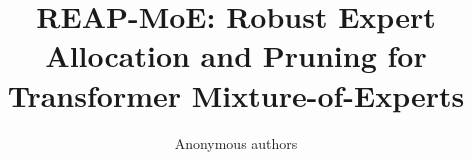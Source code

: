 \title{\textbf{REAP-MoE: Robust Expert Allocation and Pruning for Transformer Mixture-of-Experts}}

\author{Anonymous authors}
